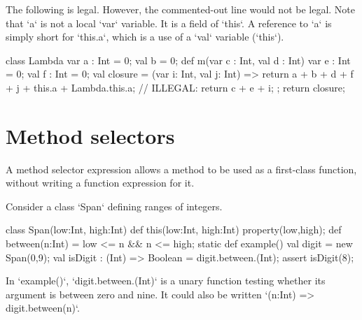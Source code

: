 \begin{eg}
 The following is legal.  
However, the commented-out line would not be legal.
Note that \xcd`a` is not a local \xcd`var` variable. It is a field of
\xcd`this`. A reference to \xcd`a` is simply short for \xcd`this.a`, which is
a use of a \xcd`val` variable (\xcd`this`).  
\begin{xten}
class Lambda {
   var a : Int = 0;
   val b = 0;
   def m(var c : Int, val d : Int) {
      var e : Int = 0;
      val f : Int = 0;
      val closure = (var i: Int, val j: Int) => {
    	  return a + b + d + f + j + this.a + Lambda.this.a;
          // ILLEGAL: return c + e + i;
      };
      return closure;
   }
}
\end{xten}
%
\end{eg}

\section{Method selectors}
\label{MethodSelectors}

A method selector expression allows a method to be used as a
first-class function, without writing a function expression for it.

\begin{ex}
Consider a class \xcd`Span` defining ranges of integers.  

\begin{xten}
class Span(low:Int, high:Int) {
  def this(low:Int, high:Int) {property(low,high);}
  def between(n:Int) = low <= n && n <= high;
  static def example() {
    val digit = new Span(0,9);
    val isDigit : (Int) => Boolean = digit.between.(Int);
    assert isDigit(8);
  }
}
\end{xten}
\noindent


In \xcd`example()`, 
\xcd`digit.between.(Int)` 
is a unary function testing whether its argument is between zero
and nine.  It could also be written 
\xcd`(n:Int) => digit.between(n)`.
\end{ex}


